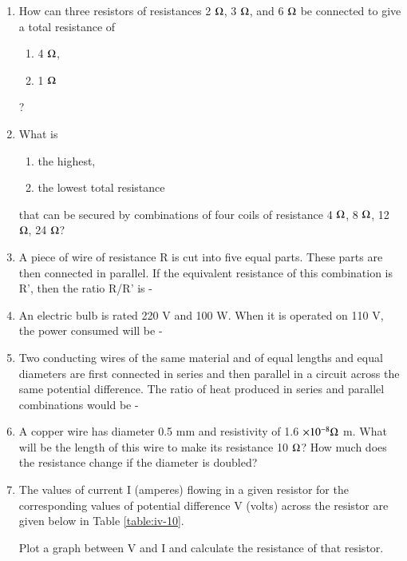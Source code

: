 \begin{enumerate}[label=\arabic*.,ref=\thesection.\theenumi]
\item  How can three resistors of resistances 2 $\ohm$, 3 $\ohm$, and 6 $\ohm$ be connected to give a total resistance of
 \begin{enumerate} \item 4 $\ohm$, \item 1 $\ohm$ \end{enumerate}?
\item What is 
\begin{enumerate} \item the highest, \item the lowest total resistance 
\end{enumerate}
that can be secured by combinations of four coils of resistance 4 $\ohm$, 8 $\ohm$, 12 $\ohm$, 24 $\ohm$?
\item  A piece of wire of resistance R is cut into five equal parts. These parts are then connected in parallel. If the equivalent resistance of this combination is R', then the ratio R/R' is -
\item  An electric bulb is rated 220 V and 100 W. When it is operated on 110 V, the power consumed will be - 
\item  Two conducting wires of the same material and of equal lengths and equal diameters are first connected in series and then parallel in a circuit across the same potential difference. The ratio of heat produced in series and parallel combinations would be -
\item  A copper wire has diameter 0.5 mm and resistivity of 1.6 $\times 10^{-8} \ohm$ m. What will be
the length of this wire to make its resistance 10 $\ohm$? How much does the resistance change if the diameter is doubled?
\item  The values of current I (amperes)  flowing in a given resistor for the corresponding values of potential difference V (volts) across the resistor are given below in Table \ref{table:iv-10}.
%
\begin{table}[!ht]
\centering

\caption{}
\label{table:iv-10}
\end{table}
%
Plot a graph between V and I and calculate the resistance of that resistor.

\end{enumerate}
